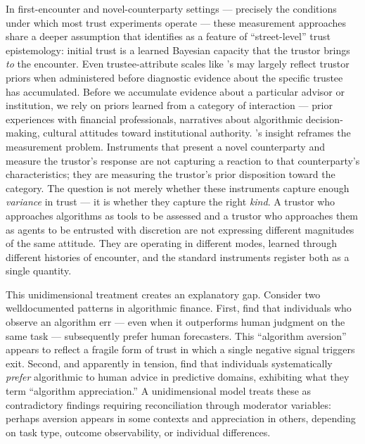 In first-encounter and novel-counterparty settings --- precisely the conditions under which most trust experiments operate --- these measurement approaches share a deeper assumption that \citet{hardin1993street} identifies as a feature of ``street-level'' trust epistemology: initial trust is a learned Bayesian capacity that the trustor brings \textit{to} the encounter. Even trustee-attribute scales like \citeauthor{MayerDavisSchoorman1995}'s may largely reflect trustor priors when administered before diagnostic evidence about the specific trustee has accumulated. Before we accumulate evidence about a particular advisor or institution, we rely on priors learned from a category of interaction --- prior experiences with financial professionals, narratives about algorithmic decision-making, cultural attitudes toward institutional authority. \citeauthor{hardin1993street}'s insight reframes the measurement problem. Instruments that present a novel counterparty and measure the trustor's response are not capturing a reaction to that counterparty's characteristics; they are measuring the trustor's prior disposition toward the category. The question is not merely whether these instruments capture enough \textit{variance} in trust --- it is whether they capture the right \textit{kind}. A trustor who approaches algorithms as tools to be assessed and a trustor who approaches them as agents to be entrusted with discretion are not expressing different magnitudes of the same attitude. They are operating in different modes, learned through different histories of encounter, and the standard instruments register both as a single quantity.

This unidimensional treatment creates an explanatory gap. Consider two well\-documented patterns in algorithmic finance. First, \citet{DietvorstSimmonsMassey2015} find that individuals who observe an algorithm err --- even when it outperforms human judgment on the same task --- subsequently prefer human forecasters. This ``algorithm aversion'' appears to reflect a fragile form of trust in which a single negative signal triggers exit. Second, and apparently in tension, \citet{LoggMinsonMoore2019} find that individuals systematically \textit{prefer} algorithmic to human advice in predictive domains, exhibiting what they term ``algorithm appreciation.'' A unidimensional model treats these as contradictory findings requiring reconciliation through moderator variables: perhaps aversion appears in some contexts and appreciation in others, depending on task type, outcome observability, or individual differences.

